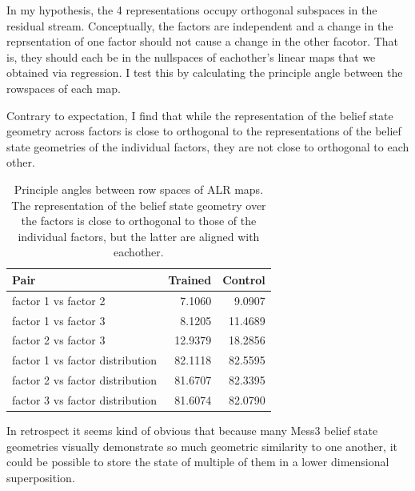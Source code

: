\documentclass[11pt,a4paper]{article}
\begin{document}
In my hypothesis, the 4 representations occupy orthogonal subspaces in the residual stream. Conceptually, the factors are independent and a change in the reprsentation of one factor should not cause a change in the other facotor. That is, they should each be in the nullspaces of eachother's linear maps that we obtained via regression. I test this by calculating the principle angle between the rowspaces of each map.

\vspace{5mm}

Contrary to expectation, I find that while the representation of the belief state geometry across factors is close to orthogonal to the representations of the belief state geometries of the individual factors, they are not close to orthogonal to each other.

\begin{table}[ht]
    \centering
    \caption{Principle angles between row spaces of ALR maps. The representation of the belief state geometry over the factors is close to orthogonal to those of the individual factors, but the latter are aligned with eachother.}
    \label{tab:e3_within_angles_prob}
    \begin{tabular}{lrr}
        \toprule
        Pair & Trained & Control \\
        \midrule
        factor 1 vs factor 2 & 7.1060 & 9.0907 \\
        factor 1 vs factor 3 & 8.1205 & 11.4689 \\
        factor 2 vs factor 3 & 12.9379 & 18.2856 \\
        factor 1 vs factor distribution & 82.1118 & 82.5595 \\
        factor 2 vs factor distribution & 81.6707 & 82.3395 \\
        factor 3 vs factor distribution & 81.6074 & 82.0790 \\
        \bottomrule
    \end{tabular}
\end{table}

\vspace{5mm}

In retrospect it seems kind of obvious that because many Mess3 belief state geometries visually demonstrate so much geometric similarity to one another, it could be possible to store the state of multiple of them in a lower dimensional superposition. 

\vspace{3mm}
\end{document}

